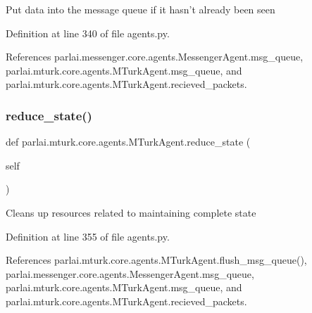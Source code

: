 \begin{DoxyVerb}Put data into the message queue if it hasn't already been seen\end{DoxyVerb}
 

Definition at line 340 of file agents.\+py.



References parlai.\+messenger.\+core.\+agents.\+Messenger\+Agent.\+msg\+\_\+queue, parlai.\+mturk.\+core.\+agents.\+M\+Turk\+Agent.\+msg\+\_\+queue, and parlai.\+mturk.\+core.\+agents.\+M\+Turk\+Agent.\+recieved\+\_\+packets.

\mbox{\label{classparlai_1_1mturk_1_1core_1_1agents_1_1MTurkAgent_aa5dd2f607442909921b3108b416460b3}} 
\subsubsection{\texorpdfstring{reduce\+\_\+state()}{reduce\_state()}}
{\footnotesize\ttfamily def parlai.\+mturk.\+core.\+agents.\+M\+Turk\+Agent.\+reduce\+\_\+state (\begin{DoxyParamCaption}\item[{}]{self }\end{DoxyParamCaption})}

\begin{DoxyVerb}Cleans up resources related to maintaining complete state\end{DoxyVerb}
 

Definition at line 355 of file agents.\+py.



References parlai.\+mturk.\+core.\+agents.\+M\+Turk\+Agent.\+flush\+\_\+msg\+\_\+queue(), parlai.\+messenger.\+core.\+agents.\+Messenger\+Agent.\+msg\+\_\+queue, parlai.\+mturk.\+core.\+agents.\+M\+Turk\+Agent.\+msg\+\_\+queue, and parlai.\+mturk.\+core.\+agents.\+M\+Turk\+Agent.\+recieved\+\_\+packets.

